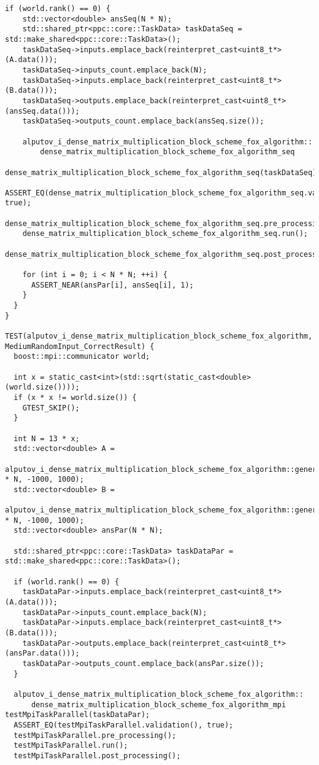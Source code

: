 \documentclass{report}
\begin{document}
\begin{lstlisting}[caption={main.cpp(func tests)},label=lst:opsmpi2]
  if (world.rank() == 0) {
    std::vector<double> ansSeq(N * N);
    std::shared_ptr<ppc::core::TaskData> taskDataSeq = std::make_shared<ppc::core::TaskData>();
    taskDataSeq->inputs.emplace_back(reinterpret_cast<uint8_t*>(A.data()));
    taskDataSeq->inputs_count.emplace_back(N);
    taskDataSeq->inputs.emplace_back(reinterpret_cast<uint8_t*>(B.data()));
    taskDataSeq->outputs.emplace_back(reinterpret_cast<uint8_t*>(ansSeq.data()));
    taskDataSeq->outputs_count.emplace_back(ansSeq.size());

    alputov_i_dense_matrix_multiplication_block_scheme_fox_algorithm::
        dense_matrix_multiplication_block_scheme_fox_algorithm_seq
            dense_matrix_multiplication_block_scheme_fox_algorithm_seq(taskDataSeq);
    ASSERT_EQ(dense_matrix_multiplication_block_scheme_fox_algorithm_seq.validation(), true);
    dense_matrix_multiplication_block_scheme_fox_algorithm_seq.pre_processing();
    dense_matrix_multiplication_block_scheme_fox_algorithm_seq.run();
    dense_matrix_multiplication_block_scheme_fox_algorithm_seq.post_processing();

    for (int i = 0; i < N * N; ++i) {
      ASSERT_NEAR(ansPar[i], ansSeq[i], 1);
    }
  }
}

TEST(alputov_i_dense_matrix_multiplication_block_scheme_fox_algorithm, MediumRandomInput_CorrectResult) {
  boost::mpi::communicator world;

  int x = static_cast<int>(std::sqrt(static_cast<double>(world.size())));
  if (x * x != world.size()) {
    GTEST_SKIP();
  }

  int N = 13 * x;
  std::vector<double> A =
      alputov_i_dense_matrix_multiplication_block_scheme_fox_algorithm::generator(N * N, -1000, 1000);
  std::vector<double> B =
      alputov_i_dense_matrix_multiplication_block_scheme_fox_algorithm::generator(N * N, -1000, 1000);
  std::vector<double> ansPar(N * N);

  std::shared_ptr<ppc::core::TaskData> taskDataPar = std::make_shared<ppc::core::TaskData>();

  if (world.rank() == 0) {
    taskDataPar->inputs.emplace_back(reinterpret_cast<uint8_t*>(A.data()));
    taskDataPar->inputs_count.emplace_back(N);
    taskDataPar->inputs.emplace_back(reinterpret_cast<uint8_t*>(B.data()));
    taskDataPar->outputs.emplace_back(reinterpret_cast<uint8_t*>(ansPar.data()));
    taskDataPar->outputs_count.emplace_back(ansPar.size());
  }

  alputov_i_dense_matrix_multiplication_block_scheme_fox_algorithm::
      dense_matrix_multiplication_block_scheme_fox_algorithm_mpi testMpiTaskParallel(taskDataPar);
  ASSERT_EQ(testMpiTaskParallel.validation(), true);
  testMpiTaskParallel.pre_processing();
  testMpiTaskParallel.run();
  testMpiTaskParallel.post_processing();


\end{lstlisting}
\end{document}
